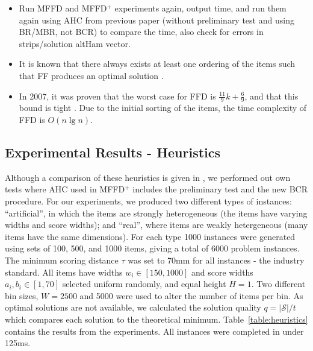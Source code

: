 \documentclass[authoryear]{elsarticle}
\begin{document}
{\color{myPink}
\begin{itemize}[leftmargin=*]
	\item Run MFFD and MFFD$^+$ experiments again, output time, and run them again using AHC from previous paper (without preliminary test and using BR/MBR, not BCR) to compare the time, also check for errors in strips/solution altHam vector.
	\item It is known that there always exists at least one ordering of the items such that FF produces an optimal solution \citet{lewis2009}.
	\item In 2007, it was proven that the worst case for FFD is $\frac{11}{9}k + \frac{6}{9}$, and that this bound is tight \citet{dosa2007}. Due to the initial sorting of the items, the time complexity of FFD is $O(n \lg n)$.
\end{itemize}
}

\subsection{Experimental Results - Heuristics}
\label{sub:expheuristics}
\noindent Although a comparison of these heuristics is given in \citet{hawa2018}, we performed out own tests where AHC used in MFFD$^+$ includes the preliminary test and the new BCR procedure. For our experiments, we produced two different types of instances: ``artificial'', in which the items are strongly heterogeneous (the items have varying widths and score widths); and ``real'', where items are weakly hetergeneous (many items have the same dimensions). For each type 1000 instances were generated using sets of 100, 500, and 1000 items, giving a total of 6000 problem instances. The minimum scoring distance $\tau$ was set to 70mm for all instances - the industry standard. All items have widths $w_i \in [150,1000]$ and score widths $a_i, b_i \in [1,70]$ selected uniform randomly, and equal height $H=1$. Two different bin sizes, $W = 2500$ and 5000 were used to alter the number of items per bin. As optimal solutions are not available, we calculated the solution quality $q = |\mathcal{S}|/ t$ which compares each solution to the theoretical minimum. Table~\ref{table:heuristics} contains the results from the experiments. All instances were completed in under 125ms.
\end{document}
